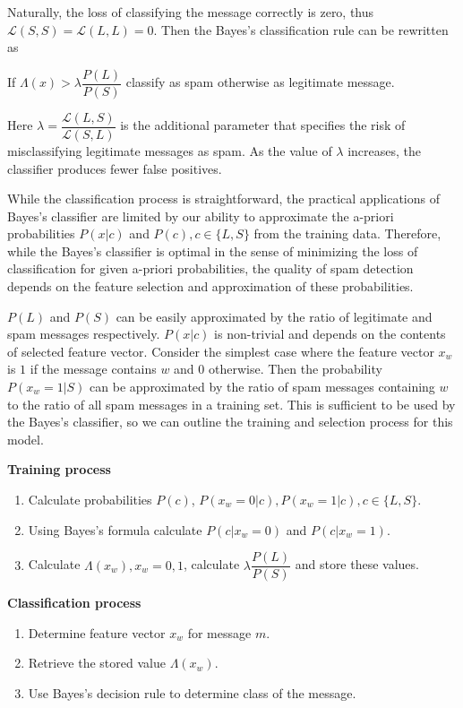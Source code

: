 \documentclass[12pt]{report}
\newcommand{\Loss}{\mathcal{L}}
\begin{document}
Naturally, the loss of classifying the message correctly is zero, thus $\Loss(S, S) = \Loss(L, L) = 0$. Then the Bayes's classification rule can be rewritten as

\begin{center}
	If $\Lambda(x) > \lambda \dfrac{P(L)}{P(S)}$ classify as spam otherwise as legitimate message.
\end{center}

Here $\lambda = \dfrac{\Loss(L, S)}{\Loss(S, L)}$ is the additional parameter that specifies the risk of misclassifying legitimate messages as spam. As the value of $\lambda$ increases, the classifier produces fewer false positives.

While the classification process is straightforward, the practical applications of Bayes's classifier are limited by our ability to approximate the a-priori probabilities $P(x | c)$ and $P(c), c \in \{L, S\}$ from the training data. Therefore, while the Bayes's classifier is optimal in the sense of minimizing the loss of classification for given a-priori probabilities, the quality of spam detection depends on the feature selection and approximation of these probabilities.

$P(L)$ and $P(S)$ can be easily approximated by the ratio of legitimate and spam messages respectively. $P(x | c)$ is non-trivial and depends on the contents of selected feature vector. Consider the simplest case where the feature vector $x_w$ is $1$ if the message contains $w$ and $0$ otherwise. Then the probability $P(x_w = 1 | S)$ can be approximated by the ratio of spam messages containing $w$ to the ratio of all spam messages in a training set. This is sufficient to be used by the Bayes's classifier, so we can outline the training and selection process for this model.

\textbf{Training process}

\begin{enumerate}
	\item Calculate probabilities $P(c)$, $P(x_w = 0 | c), P(x_w = 1 | c), c \in \{L, S\}$.
	\item Using Bayes's formula calculate $P(c | x_w = 0)$ and $P(c | x_w = 1)$.
	\item Calculate $\Lambda(x_w), x_w = 0, 1$, calculate $\lambda \dfrac{P(L)}{P(S)}$ and store these values.
\end{enumerate}

\textbf{Classification process}

\begin{enumerate}
	\item Determine feature vector $x_w$ for message $m$.
	\item Retrieve the stored value $\Lambda(x_w)$.
	\item Use Bayes's decision rule to determine class of the message.
\end{enumerate}
\end{document}
